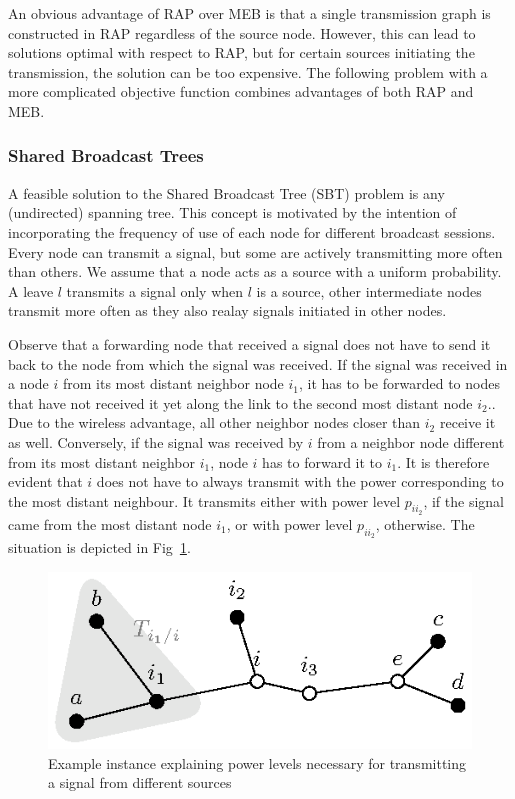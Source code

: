 An obvious advantage of RAP over MEB is that a single transmission graph is constructed in RAP regardless of the source node.
However, this can lead to solutions optimal with respect to RAP, but for certain sources initiating the transmission, the solution can be too expensive.
The following problem with a more complicated objective function combines advantages of both RAP and MEB.

\subsubsection{Shared Broadcast Trees}

A feasible solution to the Shared Broadcast Tree (SBT) problem is any (undirected) spanning tree.
This concept is motivated by the intention of incorporating the frequency of use of each node for different broadcast sessions.
Every node can transmit a signal, but some are actively transmitting more often than others.
We assume that a node acts as a source with a uniform probability. 
A leave $l$ transmits a signal only when $l$ is a source, other intermediate nodes transmit more often as they also realay signals initiated in other nodes.

Observe that a forwarding node that received a signal does not have to send it back to the node from which the signal was received.
If the signal was received in a node $i$ from its most distant neighbor node $i_1$, it has to be forwarded to nodes that have not received it yet along the link to the second most distant node $i_2$..
Due to the wireless advantage, all other neighbor nodes closer than $i_2$ receive it as well.
Conversely, if the signal was received by $i$ from a neighbor node different from its most distant neighbor $i_1$, node $i$ has to forward it to $i_1$. 
It is therefore evident that $i$ does not have to always transmit with the power corresponding to the most distant neighbour.
It transmits either with power level $p_{ii_2}$, if the signal came from the most distant node $i_1$, or with power level $p_{ii_2}$, otherwise.
The situation is depicted in Fig~\ref{fig:objexp}.
\begin{figure}[htb!]
  \centering
  \includegraphics[scale=1.4]{figurer/objexp.eps}
  \caption{Example instance explaining power levels necessary for transmitting a signal from different sources}
  \label{fig:objexp}
\end{figure}


